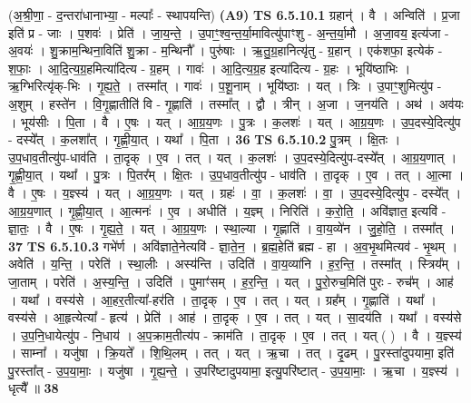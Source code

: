 \documentclass[17pt]{extarticle}
\begin{document}
                  \newline
                      (अ॒श्री॒णा॒ - द॒न्तरा॑धानाभ्या॒ - मल्पाः᳚ - स्थापयन्ति)  \textbf{(A9)} \newline \newline
                                \textbf{ TS 6.5.10.1} \newline
                  ग्रहान्॑ । वै । अन्विति॑ । प्र॒जा इति॑ प्र - जाः । प॒शवः॑ । प्रेति॑ । जा॒य॒न्ते॒ । उ॒पाꣳ॒॒श्व॒न्त॒र्या॒मावित्यु॑पाꣳशु - अ॒न्त॒र्या॒मौ । अ॒जा॒वय॒ इत्य॑जा - अ॒वयः॑ । शु॒क्राम॒न्थिना॒विति॑ शु॒क्रा - म॒न्थिनौ᳚ । पुरु॑षाः । ऋ॒तु॒ग्र॒हानित्यृ॑तु - ग्र॒हान् । एक॑शफा॒ इत्येक॑ - श॒फाः॒ । आ॒दि॒त्य॒ग्र॒हमित्या॑दित्य - ग्र॒हम् । गावः॑ । आ॒दि॒त्य॒ग्र॒ह इत्या॑दित्य - ग्र॒हः । भूयि॑ष्ठाभिः । ऋ॒ग्भिरित्यृ॑क्-भिः । गृ॒ह्य॒ते॒ । तस्मा᳚त् । गावः॑ । प॒शू॒नाम् । भूयि॑ष्ठाः । यत् । त्रिः । उ॒पाꣳ॒॒शुमित्यु॑प - अ॒शुम् । हस्ते॑न । वि॒गृ॒ह्णातीति॑ वि - गृ॒ह्णाति॑ । तस्मा᳚त् । द्वौ । त्रीन् । अ॒जा । ज॒नय॑ति । अथ॑ । अव॑यः । भूय॑सीः । पि॒ता । वै । ए॒षः । यत् । आ॒ग्र॒य॒णः । पु॒त्रः । क॒लशः॑ । यत् । आ॒ग्र॒य॒णः । उ॒प॒दस्ये॒दित्यु॑प - दस्ये᳚त् । क॒लशा᳚त् । गृ॒ह्णी॒या॒त् । यथा᳚ । पि॒ता । \textbf{  36} \newline
                  \newline
                                \textbf{ TS 6.5.10.2} \newline
                  पु॒त्रम् । क्षि॒तः । उ॒प॒धाव॒तीत्यु॑प-धाव॑ति । ता॒दृक् । ए॒व । तत् । यत् । क॒लशः॑ । उ॒प॒दस्ये॒दित्यु॑प-दस्ये᳚त् । आ॒ग्र॒य॒णात् । गृ॒ह्णी॒या॒त् । यथा᳚ । पु॒त्रः । पि॒तर᳚म् । क्षि॒तः । उ॒प॒धाव॒तीत्यु॑प - धाव॑ति । ता॒दृक् । ए॒व । तत् । आ॒त्मा । वै । ए॒षः । य॒ज्ञ्स्य॑ । यत् । आ॒ग्र॒य॒णः । यत् । ग्रहः॑ । वा॒ । क॒लशः॑ । वा॒ । उ॒प॒दस्ये॒दित्यु॑प - दस्ये᳚त् । आ॒ग्र॒य॒णात् । गृ॒ह्णी॒या॒त् । आ॒त्मनः॑ । ए॒व । अधीति॑ । य॒ज्ञ्म् । निरिति॑ । क॒रो॒ति॒ । अवि॑ज्ञात॒ इत्यवि॑ - ज्ञा॒तः॒ । वै । ए॒षः । गृ॒ह्य॒ते॒ । यत् । आ॒ग्र॒य॒णः । स्था॒ल्या । गृ॒ह्णाति॑ । वा॒य॒व्ये॑न । जु॒हो॒ति॒ । तस्मा᳚त् । \textbf{  37} \newline
                  \newline
                                \textbf{ TS 6.5.10.3} \newline
                  गभे॑र्ण । अवि॑ज्ञाते॒नेत्यवि॑ - ज्ञा॒ते॒न॒ । ब्र॒ह्म॒हेति॑ ब्रह्म - हा । अ॒व॒भृ॒थमित्यव॑ - भृ॒थम् । अवेति॑ । य॒न्ति॒ । परेति॑ । स्था॒लीः । अस्य॑न्ति । उदिति॑ । वा॒य॒व्या॑नि । ह॒र॒न्ति॒ । तस्मा᳚त् । स्त्रिय᳚म् । जा॒ताम् । परेति॑ । अ॒स्य॒न्ति॒ । उदिति॑ । पुमाꣳ॑सम् । ह॒र॒न्ति॒ । यत् । पु॒रो॒रुच॒मिति॑ पुरः - रुच᳚म् । आह॑ । यथा᳚ । वस्य॑से । आ॒हर॒तीत्या᳚-हर॑ति । ता॒दृक् । ए॒व । तत् । यत् । ग्रह᳚म् । गृ॒ह्णाति॑ । यथा᳚ । वस्य॑से । आ॒हृत्येत्या᳚ - हृत्य॑ । प्रेति॑ । आह॑ । ता॒दृक् । ए॒व । तत् । यत् । सा॒दय॑ति । यथा᳚ । वस्य॑से । उ॒प॒नि॒धायेत्यु॑प - नि॒धाय॑ । अ॒प॒क्राम॒तीत्य॑प - क्राम॑ति । ता॒दृक् । ए॒व । तत् । यत् ( ) । वै । य॒ज्ञ्स्य॑ । साम्ना᳚ । यजु॑षा । क्रि॒यते᳚ । शि॒थि॒लम् । तत् । यत् । ऋ॒चा । तत् । दृ॒ढम् । पु॒रस्ता॑दुपयामा॒ इति॑ पु॒रस्ता᳚त् - उ॒प॒या॒माः॒ । यजु॑षा । गृ॒ह्य॒न्ते॒ । उ॒परि॑ष्टादुपयामा॒ इत्यु॒परि॑ष्टात् - उ॒प॒या॒माः॒ । ऋ॒चा । य॒ज्ञ्स्य॑ । धृत्यै᳚ ॥ \textbf{  38 } \newline
\end{document}
